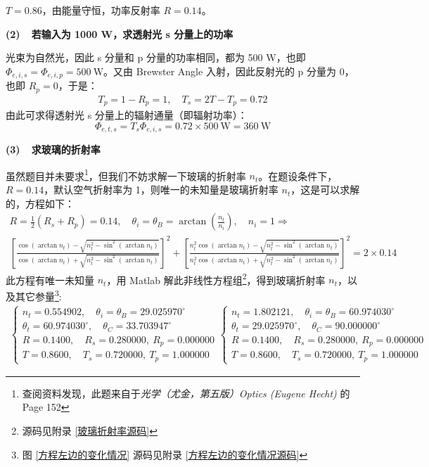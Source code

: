 \documentclass[UTF8]{report}
\theoremstyle{MyLineTheoremStyle} %
\theoremstyle{MyBlockTheoremStyle} %
\theoremstyle{MySubsubsectionStyle} %
\begin{document}
$T = 0.86$，由能量守恒，功率反射率 $R = 0.14$。

\textbf{(2)\ \ 若输入为 1000 W，求透射光 s 分量上的功率}

光束为自然光，因此 s 分量和 p 分量的功率相同，都为 500 W，也即 $\Phi_{e,i,s} = \Phi_{e,i,p} = 500 \ \mathrm{W}$。又由 Brewster Angle 入射，因此反射光的 p 分量为 0，也即 $R_p = 0$，于是：
\begin{gather}
T_p = 1 - R_p = 1,\quad T_s = 2T - T_p = 0.72 
\end{gather}
由此可求得透射光 s 分量上的辐射通量（即辐射功率）：
\begin{equation}
\Phi_{e,t,s} = T_s \Phi_{e,i,s} = 0.72 \times 500 \ \mathrm{W} =  360 \ \mathrm{W}
\end{equation}

{\color{red} \textbf{(3)\ \ 求玻璃的折射率}}

虽然题目并未要求\footnote{查阅资料发现，此题来自于\textit{光学（尤金，第五版）Optics (Eugene Hecht)} 的 Page 152}，但我们不妨求解一下玻璃的折射率 $n_t$。在题设条件下，$R = 0.14$，默认空气折射率为 1，则唯一的未知量是玻璃折射率 $n_t$，这是可以求解的，方程如下：
\begin{gather}\label{玻璃折射率}
    R = \frac{1}{2}(R_s + R_p) = 0.14,\quad \theta_i = \theta_B = \arctan\left(\frac{n_t}{n_i}\right) ,\quad n_i = 1
    \Longrightarrow \\ 
    \left[ \frac{ \cos (\arctan n_t) - \sqrt{n_{t}^2 - \sin^2 (\arctan n_t)} }{\cos (\arctan n_t) + \sqrt{n_{t}^2 - \sin^2 (\arctan n_t)}} \right]^2 + \left[ \frac{ n_{t}^2\cos (\arctan n_t) - \sqrt{n_{t}^2 - \sin^2 (\arctan n_t)} }{n_{t}^2\cos (\arctan n_t) + \sqrt{n_{t}^2 - \sin^2 (\arctan n_t)}} \right]^2  = 2\times 0.14
\end{gather}
此方程有唯一未知量 $n_t$，用 Matlab 解此非线性方程组\footnote{源码见附录 \ref{玻璃折射率源码}}，得到玻璃折射率 $n_t$，以及其它参量\footnote{图 \ref{方程左边的变化情况} 源码见附录 \ref{方程左边的变化情况源码}}: 
\begin{gather}
\begin{cases}
    n_t = 0.554902 
    ,\quad 
    \theta_i = \theta_B  = 29.025970^\circ
    \\
    \theta_t = 60.974030^\circ
    ,\quad 
    \theta_C = 33.703947^\circ
    \\
    R = 0.1400,\quad   R_s = 0.280000,\    R_p = 0.000000 \\ 
    T = 0.8600,\quad   T_s = 0.720000,\    T_p = 1.000000 
\end{cases}
\begin{cases}
    n_t = 1.802121
    ,\quad 
    \theta_i = \theta_B  = 60.974030^\circ 
    \\
    \theta_t = 29.025970^\circ
    ,\quad 
    \theta_C = 90.000000^\circ
    \\
    R = 0.1400,\quad   R_s = 0.280000,\    R_p = 0.000000 \\ 
    T = 0.8600,\quad   T_s = 0.720000,\    T_p = 1.000000 
\end{cases}
\end{gather}
\end{document}
